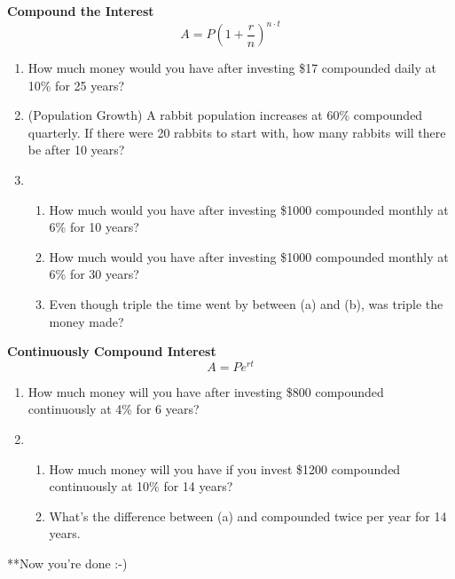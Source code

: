 \documentclass[12pt]{article}
\begin{document}
\hrulefill

\textbf{Compound the Interest}\\

$$A=P\left(1+\frac{r}{n}\right)^{n \cdot t}$$

\begin{enumerate}[resume]

\item How much money would you have after investing \$17 compounded daily at 10\% for 25 years?\\

\item (Population Growth) A rabbit population increases at 60\% compounded quarterly. If there were 20 rabbits to start with, how many rabbits will there be after 10 years?\\

\item 	\begin{enumerate}

			\item How much would you have after investing \$1000 compounded monthly at 6\% for 10 years?\\

			\item How much would you have after investing \$1000 compounded monthly at 6\% for 30 years?\\
			
			\item Even though triple the time went by between (a) and (b), was triple the money made?\\

		\end{enumerate} 

\end{enumerate}

\hrulefill

\textbf{Continuously Compound Interest}\\

$$A=Pe^{rt}$$

\begin{enumerate}[resume]

\item How much money will you have after investing \$800 compounded continuously at 4\% for 6 years?\\

\vspace{1cm}

\item 	\begin{enumerate}
		
			\item How much money will you have if you invest \$1200 compounded continuously at 10\% for 14 years?\\
			
			\item What's the difference between (a) and compounded twice per year for 14 years.\\
			
		\end{enumerate}

\end{enumerate}

\vspace{1cm}

**Now you're done :-)
\end{document}
